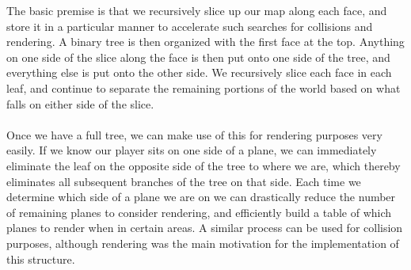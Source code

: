 \documentclass{article}
\begin{document}
The basic premise is that we recursively slice up our map along each face, and store it in a particular manner to accelerate such searches for collisions and rendering. A binary tree is then organized with the first face at the top. Anything on one side of the slice along the face is then put onto one side of the tree, and everything else is put onto the other side. We recursively slice each face in each leaf, and continue to separate the remaining portions of the world based on what falls on either side of the slice. \\
\\
Once we have a full tree, we can make use of this for rendering purposes very easily. If we know our player sits on one side of a plane, we can immediately eliminate the leaf on the opposite side of the tree to where we are, which thereby eliminates all subsequent branches of the tree on that side. Each time we determine which side of a plane we are on we can drastically reduce the number of remaining planes to consider rendering, and efficiently build a table of which planes to render when in certain areas. A similar process can be used for collision purposes, although rendering was the main motivation for the implementation of this structure.
\end{document}
